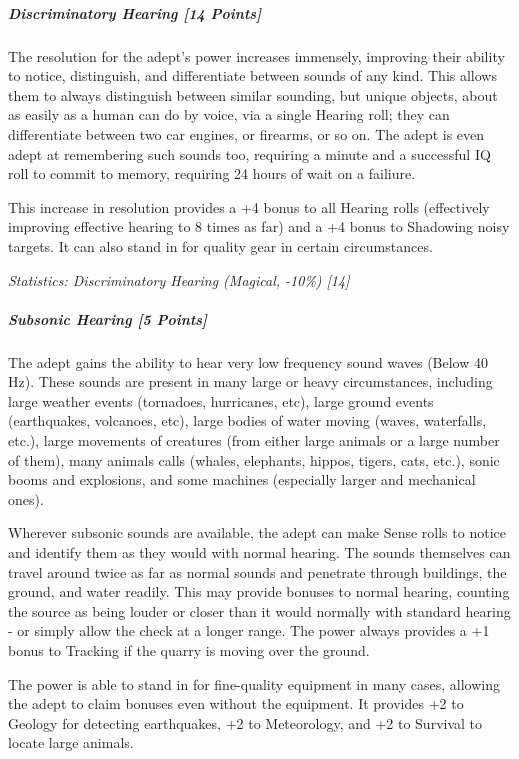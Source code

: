 \begin{multicols*}{3}
	\subparagraph{Discriminatory Hearing [14 Points]}
	
		The resolution for the adept's power increases immensely, improving their ability to notice, distinguish, and differentiate between sounds of any kind. This allows them to always distinguish between similar sounding, but unique objects, about as easily as a human can do by voice, via a single Hearing roll; they can differentiate between two car engines, or firearms, or so on. The adept is even adept at remembering such sounds too, requiring a minute and a successful IQ roll to commit to memory, requiring 24 hours of wait on a failiure.
		
		This increase in resolution provides a +4 bonus to all Hearing rolls (effectively improving effective hearing to 8 times as far) and a +4 bonus to Shadowing noisy targets. It can also stand in for quality gear in certain circumstances.
	
		\textcolor{OliveGreen}{\textit{Statistics: Discriminatory Hearing (Magical, -10\%) [14] }}
	
	\subparagraph{Subsonic Hearing [5 Points]}
	
		The adept gains the ability to hear very low frequency sound waves (Below 40 Hz). These sounds are present in many large or heavy circumstances, including large weather events (tornadoes, hurricanes, etc), large ground events (earthquakes, volcanoes, etc), large bodies of water moving (waves, waterfalls, etc.), large movements of creatures (from either large animals or a large number of them), many animals calls (whales, elephants, hippos, tigers, cats, etc.), sonic booms and explosions, and some machines (especially larger and mechanical ones). 
		
		Wherever subsonic sounds are available, the adept can make Sense rolls to notice and identify them as they would with normal hearing. The sounds themselves can travel around twice as far as normal sounds and penetrate through buildings, the ground, and water readily. This may provide bonuses to normal hearing, counting the source as being louder or closer than it would normally with standard hearing - or simply allow the check at a longer range. The power always provides a +1 bonus to Tracking if the quarry is moving over the ground. 
		
		The power is able to stand in for fine-quality equipment in many cases, allowing the adept to claim bonuses even without the equipment. It provides +2 to Geology for detecting earthquakes, +2 to Meteorology, and +2 to Survival to locate large animals.
	

\end{multicols*}
